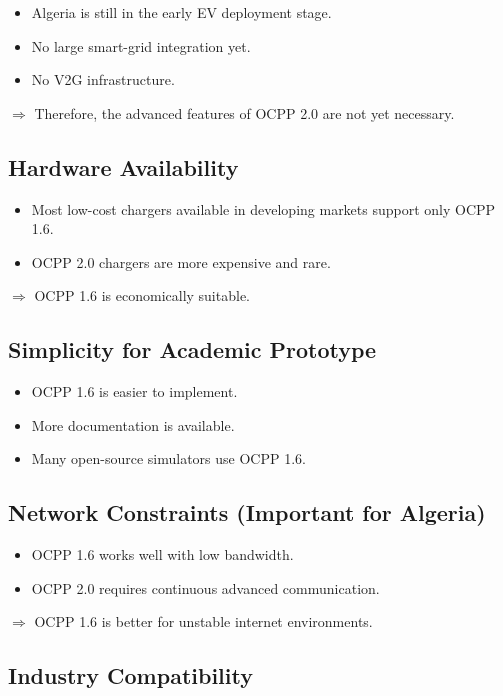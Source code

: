 \documentclass[12pt,a4paper]{report}
\begin{document}
\begin{itemize}
  \item Algeria is still in the early EV deployment stage.
  \item No large smart-grid integration yet.
  \item No V2G infrastructure.
\end{itemize}

$\Rightarrow$ Therefore, the advanced features of OCPP 2.0 are not yet necessary.

\subsection{Hardware Availability}
\begin{itemize}
  \item Most low-cost chargers available in developing markets support only OCPP 1.6.
  \item OCPP 2.0 chargers are more expensive and rare.
\end{itemize}
$\Rightarrow$ OCPP 1.6 is economically suitable.

\subsection{Simplicity for Academic Prototype}
\begin{itemize}
  \item OCPP 1.6 is easier to implement.
  \item More documentation is available.
  \item Many open-source simulators use OCPP 1.6.
\end{itemize}

\subsection{Network Constraints (Important for Algeria)}
\begin{itemize}
  \item OCPP 1.6 works well with low bandwidth.
  \item OCPP 2.0 requires continuous advanced communication.
\end{itemize}
$\Rightarrow$ OCPP 1.6 is better for unstable internet environments.

\subsection{Industry Compatibility}
\end{document}
